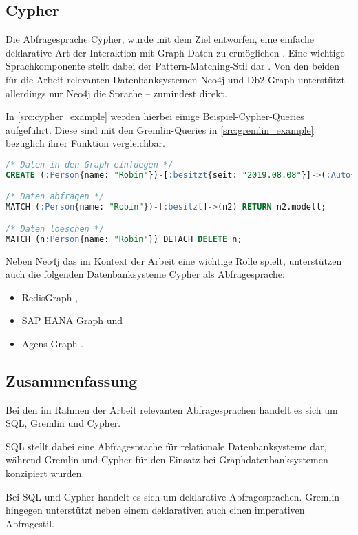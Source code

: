 \subsection{Cypher}
Die Abfragesprache Cypher, wurde mit dem Ziel entworfen, eine einfache deklarative Art der Interaktion mit Graph-Daten zu ermöglichen \cite{gdbms}. Eine wichtige Sprachkomponente stellt dabei der Pattern-Matching-Stil dar \cite{gdbms}. Von den beiden für die Arbeit relevanten Datenbanksystemen Neo4j und Db2 Graph unterstützt allerdings nur Neo4j die Sprache -- zumindest direkt. 

In \autoref{src:cypher_example} werden hierbei einige Beispiel-Cypher-Queries aufgeführt. Diese sind mit den Gremlin-Queries in \autoref{src:gremlin_example} bezüglich ihrer Funktion vergleichbar. 

\begin{lstlisting}[caption={Beispiel Cypher-Queries},language=SQL,label=src:cypher_example]
/* Daten in den Graph einfuegen */
CREATE (:Person{name: "Robin"})-[:besitzt{seit: "2019.08.08"}]->(:Auto{modell: "Leaf"});

/* Daten abfragen */
MATCH (:Person{name: "Robin"})-[:besitzt]->(n2) RETURN n2.modell;

/* Daten loeschen */
MATCH (n:Person{name: "Robin"}) DETACH DELETE n;
\end{lstlisting}

Neben Neo4j das im Kontext der Arbeit eine wichtige Rolle spielt, unterstützen auch die folgenden Datenbanksysteme Cypher als Abfragesprache:
\begin{itemize}
    \item RedisGraph \cite{redisgraph_2021},
    \item SAP HANA Graph \cite{opencypher_2021} und
    \item Agens Graph \cite{opencypher_2021}.
\end{itemize}

\subsection{Zusammenfassung}
Bei den im Rahmen der Arbeit relevanten Abfragesprachen handelt es sich um SQL, Gremlin und Cypher. 

SQL stellt dabei eine Abfragesprache für relationale Datenbanksysteme dar, während Gremlin und Cypher für den Einsatz bei Graphdatenbanksystemen konzipiert wurden. 

Bei SQL und Cypher handelt es sich um deklarative Abfragesprachen. Gremlin hingegen unterstützt neben einem deklarativen auch einen imperativen Abfragestil. 